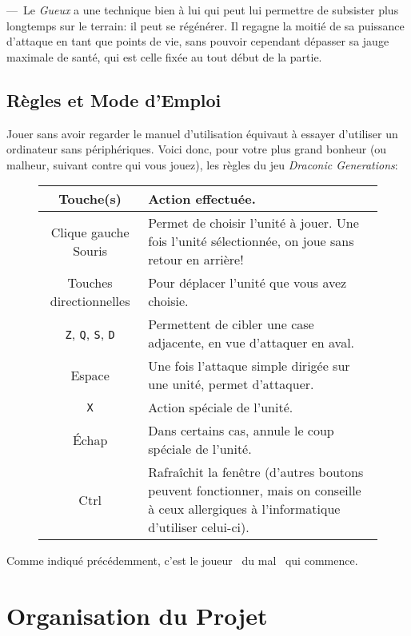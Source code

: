 \documentclass[11pt, a4paper, oneside, portrait]{article}
\begin{document}
            ---~Le \emph{Gueux} a une technique bien à lui qui peut lui permettre de subsister plus longtemps sur le terrain: il peut se régénérer.
            Il regagne la moitié de sa puissance d'attaque en tant que points de vie, sans pouvoir cependant dépasser sa jauge maximale de santé, qui est celle fixée au tout début de la partie.

        \subsection*{Règles et Mode d'Emploi}
            Jouer sans avoir regarder le manuel d'utilisation équivaut à essayer d'utiliser un ordinateur sans périphériques.
            Voici donc, pour votre plus grand bonheur (ou malheur, suivant contre qui vous jouez), les règles du jeu \emph{Draconic Generations}:
            \begin{figure}[H]
                \centering
                \begin{tabularx}{0.75\textwidth}{|c|X|}
                    \hline
                    Touche(s) & Action effectuée.\\
                    \hline
                    Clique gauche Souris & Permet de choisir l'unité à jouer. Une fois l'unité sélectionnée, on joue sans retour en arrière!\\
                    \hline
                    Touches directionnelles & Pour déplacer l'unité que vous avez choisie.\\
                    \hline
                    \texttt{Z}, \texttt{Q}, \texttt{S}, \texttt{D} & Permettent de cibler une case adjacente, en vue d'attaquer en aval.\\
                    \hline
                    Espace & Une fois l'attaque simple dirigée sur une unité, permet d'attaquer.\\
                    \hline
                    \texttt{X} & Action spéciale de l'unité.\\
                    \hline
                    Échap & Dans certains cas, annule le coup spéciale de l'unité.\\
                    \hline
                    Ctrl & Rafraîchit la fenêtre (d'autres boutons peuvent fonctionner, mais on conseille à ceux allergiques à l'informatique d'utiliser celui-ci).\\
                    \hline
                \end{tabularx}
            \end{figure}

            Comme indiqué précédemment, c'est le joueur \guillemotleft{}~du mal~\guillemotright{} qui commence.

    \section*{Organisation du Projet}



\end{document}

